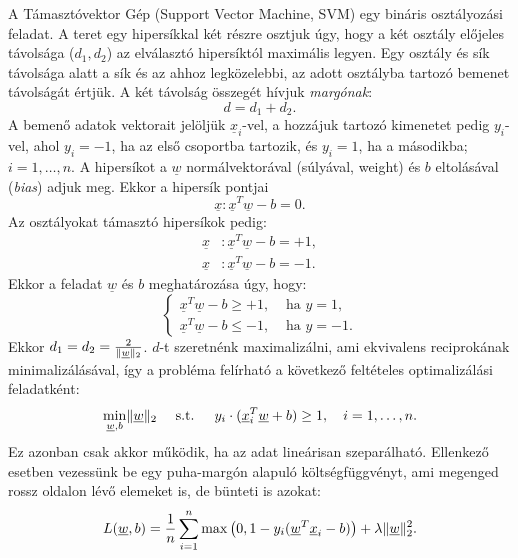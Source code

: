 A Támasztóvektor Gép \cite{cortes1995support} (Support Vector Machine, SVM) egy bináris osztályozási feladat. 
A teret egy hipersíkkal két részre osztjuk úgy, hogy a két osztály előjeles távolsága ($ d_1, d_2 $) az elválasztó hipersíktól maximális legyen. 
Egy osztály és sík távolsága alatt a sík és az ahhoz legközelebbi, az adott osztályba tartozó bemenet távolságát értjük. 
A két távolság összegét hívjuk \textit{margónak}: 
\[d = d_1 + d_2.\]
A bemenő adatok vektorait jelöljük $ \underline{x}_i $-vel, a hozzájuk tartozó kimenetet
pedig $ y_i $-vel, ahol $ y_i=-1 $, ha az első csoportba tartozik, és $ y_i=1 $, ha a másodikba; $i=1,\dots,n$.
A hipersíkot a $ \underline{w} $ normálvektorával (súlyával, weight) és $ b $ eltolásával (\textit{bias}) adjuk meg.
Ekkor a hipersík pontjai 
\[\underline{x}: \underline{x}^T \underline{w} - b = 0.\]
Az osztályokat támasztó hipersíkok pedig:
\begin{align*}
\underline{x}&\colon \underline{x}^T \underline{w} - b = +1, \\
\underline{x}&\colon \underline{x}^T \underline{w} - b = -1.
\end{align*}
Ekkor a feladat $ \underline{w} $ és $ b $ meghatározása úgy, hogy:
\[
\begin{cases}
\underline{x}^T \underline{w} - b \geq +1, & \text{ ha }  y=1, \\
\underline{x}^T \underline{w} - b \leq -1, & \text{ ha }  y=-1.
\end{cases}
\]
Ekkor $ d_1 = d_2 = \frac{2}{\lVert\underline{w}\rVert_2} $.  
$ d $-t szeretnénk maximalizálni, ami ekvivalens reciprokának minimalizálásával, így a probléma felírható a következő feltételes optimalizálási feladatként:
\[
\min\limits_{\underline{w}, b} \lVert\underline{w}\rVert_2 \quad\text{ s.t. }\quad y_i \cdot (\underline{x}_i^T \underline{w} + b) \geq 1, \quad i=1,\dots,n.
\]
Ez azonban csak akkor működik, ha az adat lineárisan szeparálható. Ellenkező esetben
vezessünk be egy puha-margón alapuló költségfüggvényt, ami megenged rossz oldalon lévő elemeket is, de bünteti is azokat:
\[
L(\underline{w},b)  = \frac{1}{n} \sum\limits_{i=1}^{n} 
\max\big(0, 1 - y_i(\underline{w}^T \underline{x}_i - b)\big) + \lambda \lVert\underline{w}\rVert_2^2.
\]


